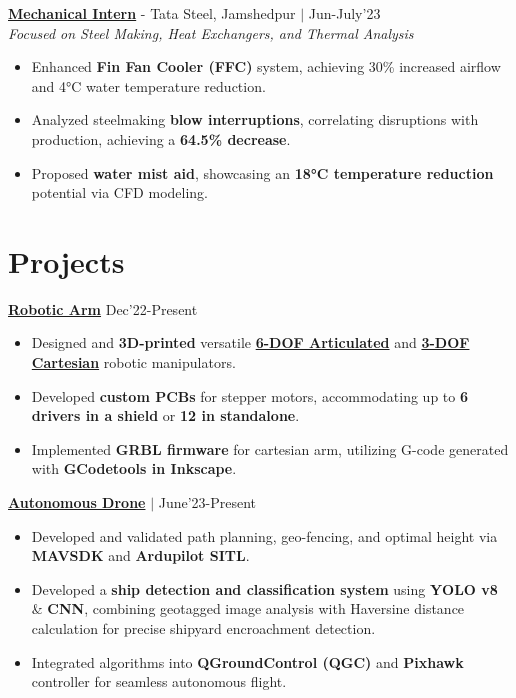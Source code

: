 \documentclass[letterpaper,11pt]{article}
\begin{document}
\textbf{{\color{MidnightBlue} \underline{Mechanical Intern}}} - Tata Steel, Jamshedpur $|$ \emph{\color{MidnightBlue} \href{https://drive.google.com/drive/folders/1rY0DQPOfQauNFIIv6MC20OoaCbj5MJas?usp=sharing}{\faGoogleDrive}} \hfill Jun-July'23 \\
\textit{Focused on Steel Making, Heat Exchangers, and Thermal Analysis}
\begin{itemize}[leftmargin=*,noitemsep,topsep=-2pt]
	\item Enhanced \textbf{Fin Fan Cooler (FFC)} system, achieving 30\% increased airflow and 4°C water temperature reduction.
	\item Analyzed steelmaking \textbf{blow interruptions}, correlating disruptions with production, achieving a \textbf{64.5\% decrease}.
	\item Proposed \textbf{water mist aid}, showcasing an \textbf{18°C temperature reduction} potential via CFD modeling.
\end{itemize}

\section{Projects}

\textbf{{\color{MidnightBlue} \underline{Robotic Arm}}} \hfill Dec'22-Present
\begin{itemize}[leftmargin=*,noitemsep,topsep=-2pt]
	\item Designed and \textbf{3D-printed} versatile \href{https://github.com/TeamRED-iiitbh/6-Axis-RoboArm}{\textbf{6-DOF Articulated}} and \href{https://github.com/TeamRED-iiitbh/Cartesian-Manipulator}{\textbf{3-DOF Cartesian}} robotic manipulators.
	\item Developed \textbf{custom PCBs} for stepper motors, accommodating up to \textbf{6 drivers in a shield} or \textbf{12 in standalone}.
	\item Implemented \textbf{GRBL firmware} for cartesian arm, utilizing G-code generated with \textbf{GCodetools in Inkscape}.
\end{itemize}

\textbf{{\color{MidnightBlue} \underline{Autonomous Drone}}} $|$ \emph{\color{MidnightBlue} \href{https://github.com/TeamRED-iiitbh/Autonomous-Drone}{\faGithub}} \hfill June'23-Present
\begin{itemize}[leftmargin=*,noitemsep,topsep=-2pt]
	\item Developed and validated path planning, geo-fencing, and optimal height via \textbf{MAVSDK} and \textbf{Ardupilot SITL}.
	\item Developed a \textbf{ship detection and classification system} using \textbf{YOLO v8} \& \textbf{CNN}, combining geotagged image analysis with Haversine distance calculation for precise shipyard encroachment detection.
	\item Integrated algorithms into \textbf{QGroundControl (QGC)} and \textbf{Pixhawk} controller for seamless autonomous flight.
\end{itemize}
\end{document}
